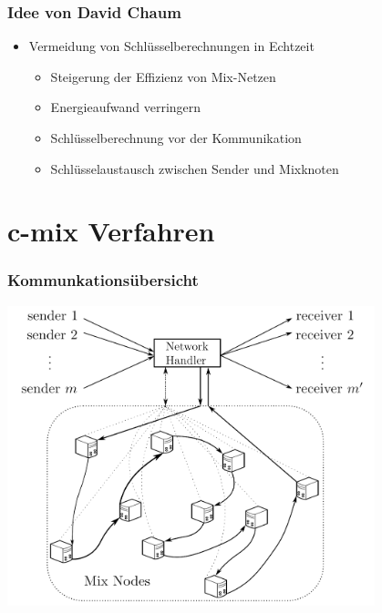 \documentclass[t, xcolor=dvipsnames]{beamer}
\begin{document}
\begin{frame}
	\frametitle{Idee von David Chaum}
	\begin{itemize}
		\item Vermeidung von Schlüsselberechnungen in Echtzeit 
			\begin{itemize}
				\item Steigerung der Effizienz von Mix-Netzen
				\item Energieaufwand verringern
				\item Schlüsselberechnung vor der Kommunikation
				\item Schlüsselaustausch zwischen Sender und Mixknoten
			\end{itemize}
	\end{itemize}
	\vspace{\fill}
\end{frame}


\section{c-mix Verfahren} %

\begin{frame}
	\frametitle{Kommunkationsübersicht}
	\begin{center}
				\includegraphics [width=0.8\textwidth]{pic/commover.png}
			\end{center}
	\vspace{\fill}
\end{frame}
\end{document}
